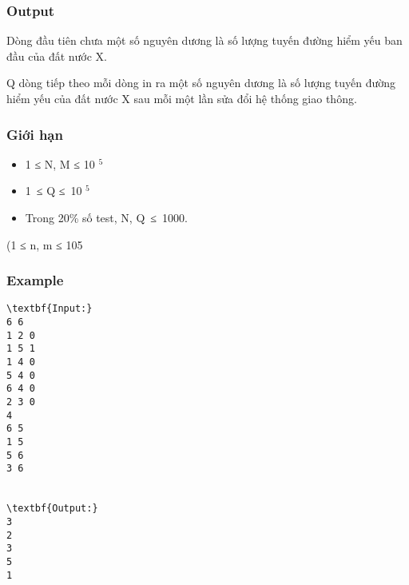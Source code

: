 \subsubsection{   Output  }

   Dòng đầu tiên chưa một số nguyên dương là số lượng tuyến đường hiểm yếu ban đầu của đất nước X.  

   Q dòng tiếp theo mỗi dòng in ra một số nguyên dương là số lượng tuyến đường hiểm yếu của đất nước X sau mỗi một lần sửa đổi hệ thống giao thông.  

\subsubsection{   Giới hạn  }
\begin{itemize}
	\item     1 ≤ N, M ≤ 10    $^     5    $
	\item     1 ≤ Q ≤ 10    $^     5    $
	\item     Trong 20\% số test, N, Q ≤ 1000.   
\end{itemize}     (1 ≤ n, m ≤ 105    

\subsubsection{   Example  }
\begin{verbatim}
\textbf{Input:}
6 6
1 2 0
1 5 1
1 4 0
5 4 0
6 4 0
2 3 0
4
6 5
1 5
5 6
3 6


\textbf{Output:}
3
2
3
5
1

\end{verbatim}